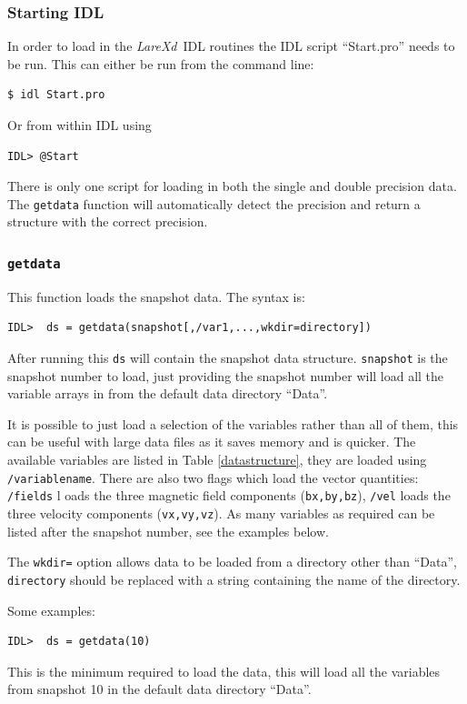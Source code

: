 \documentclass[11pt]{article}
\newcommand{\lare}{{\it LareXd}\ }
\begin{document}
\subsubsection{Starting IDL}
In order to load in the \lare IDL routines the IDL script ``Start.pro'' needs to be run. This can either be run from the command line:
\begin{verbatim}
$ idl Start.pro
\end{verbatim}
Or from within IDL using
\begin{verbatim}
IDL> @Start
\end{verbatim}

There is only one script for loading in both the single and double precision data. The \texttt{getdata} function 
will automatically detect the precision and return a structure with the correct precision.

\subsubsection{\texttt{getdata}}
This function loads the snapshot data. The syntax is:
\begin{verbatim}
IDL>  ds = getdata(snapshot[,/var1,...,wkdir=directory])
\end{verbatim}

After running this \texttt{ds} will contain the snapshot data structure. \texttt{snapshot} is the snapshot number 
to load, just providing the snapshot number will load all the variable arrays in from the default data directory ``Data''.

It is possible to just load a selection of the variables rather than all of them, this can be useful with large 
data files as it saves memory and is quicker. The available variables are listed in Table \ref{datastructure}, they 
are loaded using \texttt{/variablename}. There are also two flags which load the vector quantities: \texttt{/fields} l
oads the three magnetic field components (\texttt{bx,by,bz}), \texttt{/vel} loads the three velocity components 
(\texttt{vx,vy,vz}). As many variables as required can be listed after the snapshot number, see the examples below.

The \texttt{wkdir=} option allows data to be loaded from a directory other than ``Data'', \texttt{directory} should 
be replaced with a string containing the name of the directory.

Some examples:
\begin{verbatim}
IDL>  ds = getdata(10)
\end{verbatim}
This is the minimum required to load the data, this will load all the variables from snapshot 10 in the default data directory ``Data''.
\end{document}
